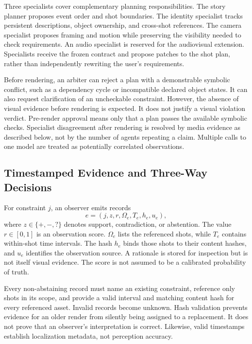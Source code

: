 Three specialists cover complementary planning responsibilities. The story
planner proposes event order and shot boundaries. The identity specialist
tracks persistent descriptions, object ownership, and cross-shot references.
The camera specialist proposes framing and motion while preserving the
visibility needed to check requirements. An audio specialist is reserved for
the audiovisual extension. Specialists receive the frozen contract and
propose patches to the shot plan, rather than independently rewriting the
user's requirements.

Before rendering, an arbiter can reject a plan with a demonstrable symbolic
conflict, such as a dependency cycle or incompatible declared object states.
It can also request clarification of an uncheckable constraint. However,
the absence of visual evidence before rendering is expected. It does not
justify a visual violation verdict. Pre-render approval means only that a
plan passes the available symbolic checks. Specialist disagreement after
rendering is resolved by media evidence as described below, not by the
number of agents repeating a claim. Multiple calls to one model are treated
as potentially correlated observations.

\subsection{Timestamped Evidence and Three-Way Decisions}
\label{sec:evidence}

For constraint $j$, an observer emits records
\begin{equation}
 e=(j,z,r,\Omega_e,T_e,h_e,u_e),
\end{equation}
where $z\in\{+, -, ?\}$ denotes support, contradiction, or abstention.
The value $r\in[0,1]$ is an observation score. $\Omega_e$ lists the referenced
shots, while $T_e$ contains within-shot time intervals. The hash $h_e$ binds
those shots to their content hashes, and $u_e$ identifies the observation
source. A rationale is
stored for inspection but is not itself visual evidence. The score is not
assumed to be a calibrated probability of truth.

Every non-abstaining record must name an existing constraint, reference only
shots in its scope, and provide a valid interval and matching content hash
for every referenced asset. Invalid records become unknown. Hash validation
prevents evidence for an older render from silently being assigned to a
replacement. It does not prove that an observer's interpretation is correct.
Likewise, valid timestamps establish localization metadata, not perception
accuracy.

